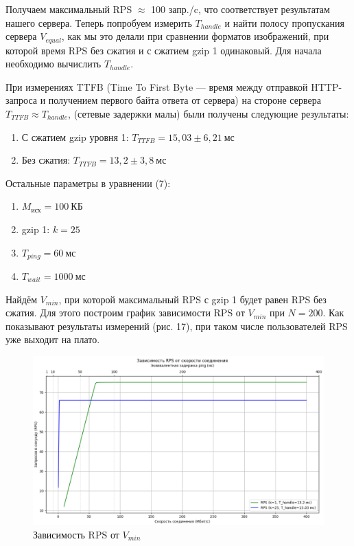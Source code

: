 \documentclass[12pt]{article}
\begin{document}
Получаем максимальный RPS $\approx$ 100 запр./c, что соответствует результатам нашего сервера. Теперь попробуем измерить $T_{handle}$ и найти полосу пропускания сервера $V_{equal}$,
как мы это делали при сравнении форматов изображений, при которой время RPS без сжатия и с сжатием gzip 1 одинаковый. Для начала необходимо вычислить $T_{handle}$.

При измерениях TTFB (Time To First Byte — время между отправкой HTTP-запроса и получением первого байта ответа от сервера) на стороне сервера $T_{TTFB} \approx T_{handle}$,
(сетевые задержки малы) были получены следующие результаты:

\begin{enumerate}
    \item С сжатием gzip уровня 1: ${T_{TTFB} = 15{,}03 \pm 6{,}21\ \text{мс}}$
    \item Без сжатия: ${T_{TTFB} = 13{,}2 \pm 3{,}8\ \text{мс}}$
\end{enumerate}

Остальные параметры в уравнении (7):

\begin{enumerate}
    \item $M_{\text{исх}} = 100\ \text{КБ}$
    \item gzip 1: $k = 25$
    \item $T_{ping} = 60\ \text{мс}$
    \item $T_{wait} = 1000\ \text{мс}$
\end{enumerate}

Найдём $V_{min}$, при которой максимальный RPS с gzip 1 будет равен RPS без сжатия. Для этого построим
график зависимости RPS от $V_{min}$ при $N = 200$. Как показывают результаты измерений (рис. 17), при таком числе пользователей
RPS уже выходит на плато.

\begin{figure}[h]
    \centering
    \includegraphics[width=1\textwidth]{../images/rps_from_v.png}
    \caption{Зависимость RPS от $V_{min}$}
\end{figure}
\end{document}

